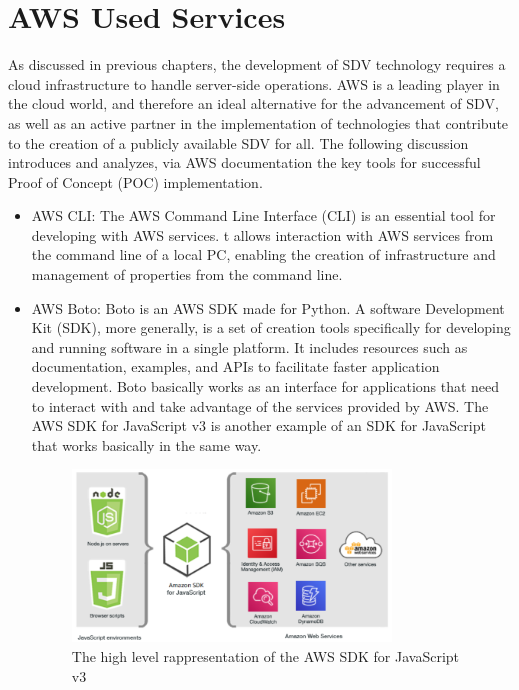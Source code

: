 \section{AWS Used Services}
As discussed in previous chapters, the development of SDV technology requires a cloud infrastructure to handle server-side operations. AWS is a leading player in the cloud world, and therefore an ideal alternative for the advancement of SDV, as well as an active partner in the implementation of technologies that contribute to the creation of a publicly available SDV for all. The following discussion introduces and analyzes, via AWS documentation the key tools for successful Proof of Concept (POC) implementation.

\begin{itemize}
    \item AWS CLI: The AWS Command Line Interface (CLI) is an essential tool for developing with AWS services. t allows interaction with AWS services from the command line of a local PC, enabling the creation of infrastructure and management of properties from the command line.
    \item AWS Boto: Boto is an AWS SDK made for Python. A software Development Kit (SDK), more generally, is a set of creation tools specifically for developing and running software in a single platform. It includes resources such as documentation, examples, and APIs to facilitate faster application development. Boto basically works as an interface for applications that need to interact with and take advantage of the services provided by AWS. The AWS SDK for JavaScript v3 is another example of an SDK for JavaScript that works basically in the same way.
    \begin{figure}[h]  %
        \centering
        \includegraphics[width=0.8\textwidth]{images/AWSSDK.png}  %
        \caption{The high level rappresentation of the AWS SDK for JavaScript v3 \cite{AWSSDK}}

\end{figure}
\end{itemize}
